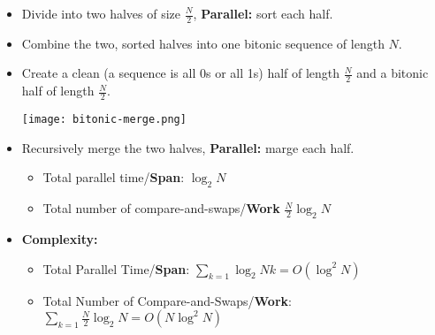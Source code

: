 \documentclass[../main.tex]{subfiles}
\begin{document}
\begin{itemize}
	\item Divide into two halves of size \(\frac{N}{2}\), \textbf{Parallel:} sort each half.
	\item Combine the two, sorted halves into one bitonic sequence of length \(N\).
	\item Create a clean (a sequence is all 0s or all 1s) half of length \(\frac{N}{2}\) and a bitonic half of length \(\frac{N}{2}\).
	      \begin{center}
		      \texttt{[image: bitonic-merge.png]}
	      \end{center}
	\item Recursively merge the two halves, \textbf{Parallel:} marge each half.
	      \begin{itemize}
		      \item Total parallel time/\textbf{Span}: \(\log_2{N}\)
		      \item Total number of compare-and-swaps/\textbf{Work} \(\frac{N}{2}\log_2{N}\)
	      \end{itemize}
	\item \textbf{Complexity:}
	      \begin{itemize}
		      \item Total Parallel Time/\textbf{Span}: \(\sum_{k=1}\log_2{Nk} = O(\log^2{N})\)
		      \item Total Number of Compare-and-Swaps/\textbf{Work}: \(\sum_{k=1}\frac{N}{2}\log_2{N} = O(N\log^2{N})\)
	      \end{itemize}
\end{itemize}
\end{document}
